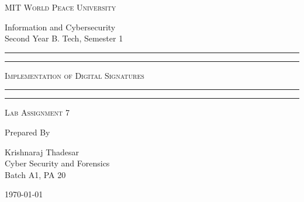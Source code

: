 \documentclass[11pt]{article}
\begin{document}
\begin{titlepage}
    \centering


    \huge\textsc{
        MIT World Peace University
    }\\

    \vspace{0.75\baselineskip} %

    \LARGE{
        Information and Cybersecurity\\
        Second Year B. Tech, Semester 1
    }

    \vfill %


    \rule{\textwidth}{1.6pt}\vspace*{-\baselineskip}\vspace*{2pt}
    \rule{\textwidth}{0.6pt}
    \vspace{0.75\baselineskip} %



    \huge{\textsc{
            Implementation of Digital Signatures
        }} \\



    \vspace{0.5\baselineskip} %
    \rule{\textwidth}{0.6pt}\vspace*{-\baselineskip}\vspace*{2.8pt}
    \rule{\textwidth}{1.6pt}

    \vspace{1\baselineskip} %


    \LARGE\textsc{
        Lab Assignment 7
    } %
    \vfill


    Prepared By
    \vspace{0.5\baselineskip} %

    \Large{
        Krishnaraj Thadesar \\
        Cyber Security and Forensics\\
        Batch A1, PA 20
    }


    \vspace{0.5\baselineskip} %
    \today

\end{titlepage}
\end{document}
